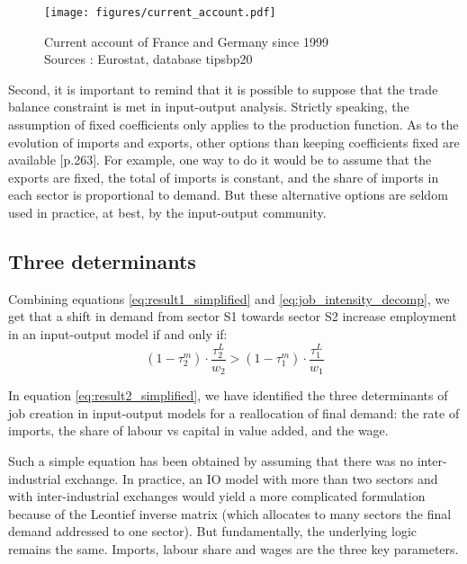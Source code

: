 \begin{figure}[!ht]
	\centering
	\texttt{[image: figures/current\_account.pdf]}
	\caption[Current account of France and Germany since 1999]{Current account of France and Germany since 1999 \\ Sources : Eurostat, database tipsbp20}
	\label{fig:current_account}
\end{figure}

Second, it is important to remind that it is possible to suppose that the trade balance constraint is met in input-output analysis. 
Strictly speaking, the assumption of fixed coefficients only applies to the production function. 
As to the evolution of imports and exports, other options  than keeping coefficients fixed are available \citep{Stoleru1969}[p.263]. 
For example, one way to do it would be to assume that the exports are fixed, the total of imports is constant, and the share of imports in each sector is proportional to demand.
But these alternative options are seldom used in practice, at best,  by the input-output community.


\subsection{Three determinants}

Combining equations \ref{eq:result1_simplified} and \ref{eq:job_intensity_decomp}, we get that a shift in demand from sector S1 towards sector S2 increase employment in an input-output model if and only if:
\begin{equation}
(1-\tau^m_2) \cdot \frac{\tau^L_2}{w_2} > (1-\tau^m_1) \cdot \frac{\tau^L_1}{w_1}
\label{eq:result2_simplified}
\end{equation}

In equation \ref{eq:result2_simplified}, we have identified the three determinants of job creation in input-output models for a reallocation of final demand: the rate of imports, the share of labour vs capital in value added, and the wage. 

Such a simple equation has been obtained by assuming that there was no inter-industrial exchange. In practice, an IO model with more than two sectors and with inter-industrial exchanges would yield a more complicated formulation because of the Leontief inverse matrix (which allocates to many sectors the final demand addressed to one sector).
But fundamentally, the underlying logic remains the same. Imports, labour share and wages are the three key parameters.

